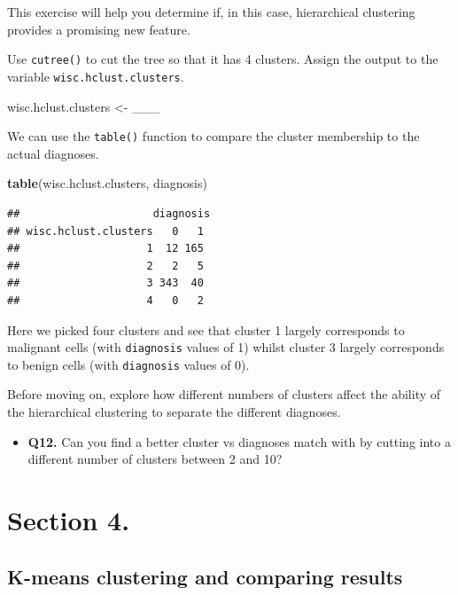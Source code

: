 \documentclass[]{article}
\newenvironment{Shaded}{\begin{snugshade}}{\end{snugshade}}
\newcommand{\KeywordTok}[1]{\textcolor[rgb]{0.13,0.29,0.53}{\textbf{#1}}}
\newcommand{\StringTok}[1]{\textcolor[rgb]{0.31,0.60,0.02}{#1}}
\newcommand{\NormalTok}[1]{#1}
\providecommand{\tightlist}{%
  \setlength{\itemsep}{0pt}\setlength{\parskip}{0pt}}
\begin{document}
This exercise will help you determine if, in this case, hierarchical
clustering provides a promising new feature.

Use \texttt{cutree()} to cut the tree so that it has 4 clusters. Assign
the output to the variable \texttt{wisc.hclust.clusters}.

\begin{Shaded}
\begin{Highlighting}[]
\NormalTok{wisc.hclust.clusters <-}\StringTok{ }\NormalTok{___}
\end{Highlighting}
\end{Shaded}

We can use the \texttt{table()} function to compare the cluster
membership to the actual diagnoses.

\begin{Shaded}
\begin{Highlighting}[]
\KeywordTok{table}\NormalTok{(wisc.hclust.clusters, diagnosis)}
\end{Highlighting}
\end{Shaded}

\begin{verbatim}
##                     diagnosis
## wisc.hclust.clusters   0   1
##                    1  12 165
##                    2   2   5
##                    3 343  40
##                    4   0   2
\end{verbatim}

Here we picked four clusters and see that cluster 1 largely corresponds
to malignant cells (with \texttt{diagnosis} values of 1) whilst cluster
3 largely corresponds to benign cells (with \texttt{diagnosis} values of
0).

Before moving on, explore how different numbers of clusters affect the
ability of the hierarchical clustering to separate the different
diagnoses.

\begin{itemize}
\tightlist
\item
  \textbf{Q12.} Can you find a better cluster vs diagnoses match with by
  cutting into a different number of clusters between 2 and 10?
\end{itemize}

\section{Section 4.}\label{section-4.}

\subsection{K-means clustering and comparing
results}\label{k-means-clustering-and-comparing-results}
\end{document}
